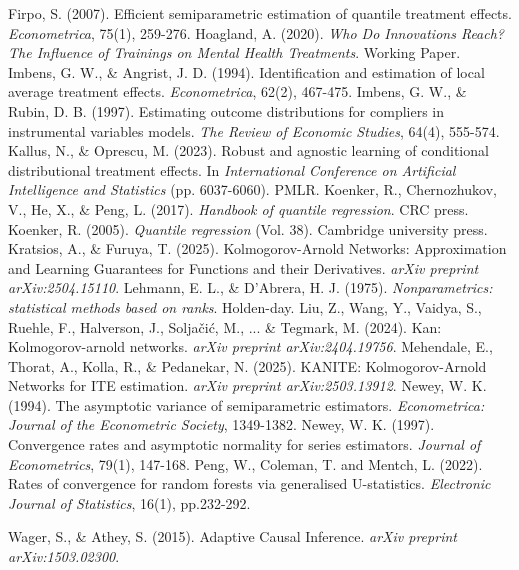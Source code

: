 \documentclass[final,3p,fleqn, 10pt]{elsarticle}
\begin{document}
\begin{thebibliography}{99}
 Firpo, S. (2007). Efficient semiparametric estimation of quantile treatment effects. \textit{Econometrica}, 75(1), 259-276.
 Hoagland, A. (2020). \textit{Who Do Innovations Reach? The Influence of Trainings on Mental Health Treatments}. Working Paper.
 Imbens, G. W., \& Angrist, J. D. (1994). Identification and estimation of local average treatment effects. \textit{Econometrica}, 62(2), 467-475.
 Imbens, G. W., \& Rubin, D. B. (1997). Estimating outcome distributions for compliers in instrumental variables models. \textit{The Review of Economic Studies}, 64(4), 555-574.
 Kallus, N., \& Oprescu, M. (2023). Robust and agnostic learning of conditional distributional treatment effects. In \textit{International Conference on Artificial Intelligence and Statistics} (pp. 6037-6060). PMLR.
 Koenker, R., Chernozhukov, V., He, X., \& Peng, L. (2017). \textit{Handbook of quantile regression}. CRC press.
 Koenker, R. (2005). \textit{Quantile regression} (Vol. 38). Cambridge university press.
 Kratsios, A., \& Furuya, T. (2025). Kolmogorov-Arnold Networks: Approximation and Learning Guarantees for Functions and their Derivatives. \textit{arXiv preprint arXiv:2504.15110}.
 Lehmann, E. L., \& D'Abrera, H. J. (1975). \textit{Nonparametrics: statistical methods based on ranks}. Holden-day.
 Liu, Z., Wang, Y., Vaidya, S., Ruehle, F., Halverson, J., Solja{\v{c}}i{\'c}, M., ... \& Tegmark, M. (2024). Kan: Kolmogorov-arnold networks. \textit{arXiv preprint arXiv:2404.19756}.
 Mehendale, E., Thorat, A., Kolla, R., \& Pedanekar, N. (2025). KANITE: Kolmogorov-Arnold Networks for ITE estimation. \textit{arXiv preprint arXiv:2503.13912}.
 Newey, W. K. (1994). The asymptotic variance of semiparametric estimators. \textit{Econometrica: Journal of the Econometric Society}, 1349-1382.
 Newey, W. K. (1997). Convergence rates and asymptotic normality for series estimators. \textit{Journal of Econometrics}, 79(1), 147-168. %
 Peng, W., Coleman, T. and Mentch, L. (2022). Rates of convergence for random forests via generalised U-statistics. \textit{Electronic Journal of Statistics}, 16(1), pp.232-292. %

 Wager, S., \& Athey, S. (2015). Adaptive Causal Inference. \textit{arXiv preprint arXiv:1503.02300}. %


\end{thebibliography}
\end{document}
